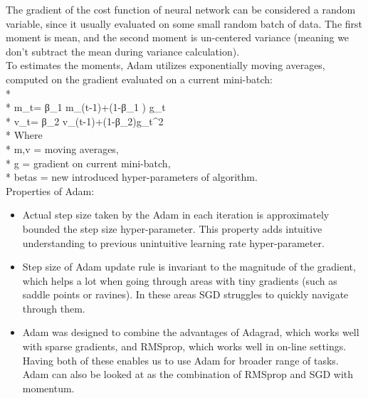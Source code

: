 \documentclass{article}
\begin{document}
\noindent The gradient of the cost function of neural network can be considered a random variable, since it usually evaluated on some small random batch of data. The first moment is mean, and the second moment is un-centered variance (meaning we don’t subtract the mean during variance calculation).\\
To estimates the moments, Adam utilizes exponentially moving averages, computed on the gradient evaluated on a current mini-batch:\\*
\\*
m_t= β_1 m_(t-1)+(1-β_1 ) g_t\\*
v_t= β_2 v_(t-1)+(1-β_2)g_t^2\\*
Where \\*
m,v = moving\hspace{1.5 mm} averages,\\*
g = gradient\hspace{1.5 mm} on\hspace{1.5 mm} current mini-batch,\\*
betas = new\hspace{1.5 mm} introduced\hspace{1.5 mm} hyper-parameters\hspace{1.5 mm} of\hspace{1.5 mm} algorithm.\\


Properties of Adam:
\begin{itemize}
   \item Actual step size taken by the Adam in each iteration is approximately bounded the step size hyper-parameter. This property adds intuitive understanding to previous unintuitive learning rate hyper-parameter.   
   \item Step size of Adam update rule is invariant to the magnitude of the gradient, which helps a lot when going through areas with tiny gradients (such as saddle points or ravines). In these areas SGD struggles to quickly navigate through them.
   \item Adam was designed to combine the advantages of Adagrad, which works well with sparse gradients, and RMSprop, which works well in on-line settings. Having both of these enables us to use Adam for broader range of tasks. Adam can also be looked at as the combination of RMSprop and SGD with momentum.
\end{itemize}
\end{document}
